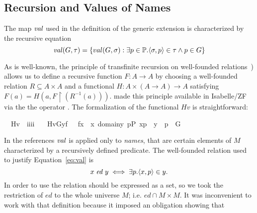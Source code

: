 \subsection*{Recursion and Values of Names}

The map $\operatorname{\mathit{val}}$ used in the definition of the generic extension is
characterized by the recursive equation
\begin{equation}
  \label{eq:val}
  \val(G,\tau) = \{val(G,\sigma) :\exists p \in\PP .%
  \lb\sigma,p\rb \in \tau \wedge p \in G \}
\end{equation}

As is well-known, the principle of transfinite recursion on
well-founded relations~\cite[p. 48]{kunen2011set}) allows us to define
a recursive function $F \colon A\to A$ by choosing a well-founded
relation $R \subseteq A\times A$ and a functional
$H\colon A\times (A \to A) \to A$ satisfying
$F(a)=H(a,F\!\upharpoonright\!(R^{-1}(a)))$. \citet{paulson1995set}
made this principle available in Isabelle/ZF via the the operator
. The formalization of the functional $\mathit{Hv}$ is
straightforward:
%
\begin{isabelle}
\isamarkupfalse%
\isanewline
\ \ Hv\ {\isacharcolon}{\isacharcolon}\ {\isachardoublequoteopen}i{\isasymRightarrow}i{\isasymRightarrow}i{\isasymRightarrow}i{\isachardoublequoteclose}\ \isanewline
\ \ {\isachardoublequoteopen}Hv{\isacharparenleft}G{\isacharcomma}y{\isacharcomma}f{\isacharparenright}\ {\isacharequal}{\isacharequal}\ {\isacharbraceleft}\ f{\isacharbackquote}x\ {\isachardot}{\isachardot}\ x{\isasymin}\ domain{\isacharparenleft}y{\isacharparenright}{\isacharcomma}\ {\isasymexists}p{\isasymin}P{\isachardot}\ {\isacharless}x{\isacharcomma}p{\isachargreater}\ {\isasymin}\ y\ {\isasymand}\ p\ {\isasymin}\ G\ {\isacharbraceright}{\isachardoublequoteclose}
\end{isabelle}
In the references \cite{kunen2011set,weaver2014forcing} $\operatorname{\mathit{val}}$ is
applied only to \emph{names}, that are certain elements of $M$
characterized by a recursively defined predicate. The well-founded
relation used to justify Equation~\eqref{eq:val} is
\[ x \mathrel{\mathit{ed}} y \iff \exists p . \langle x,p\rangle\in y. \] In
order to use  the relation should be expressed as a set, so
we took the restriction of $\mathit{ed}$ to the whole universe
$M$; i.e. $\mathit{ed}\cap M\times M$.  It was inconvenient to work
with that definition because it imposed an obligation showing that
